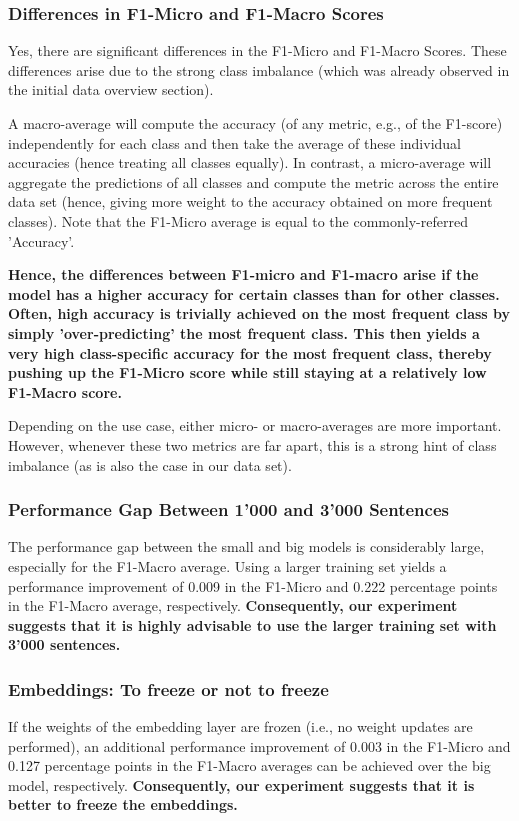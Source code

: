 \documentclass{article}
\begin{document}
\subsubsection{Differences in F1-Micro and F1-Macro Scores}
Yes, there are significant differences in the F1-Micro and F1-Macro Scores. These differences arise due to the strong class imbalance (which was already observed in the initial data overview section).

A macro-average will compute the accuracy (of any metric, e.g., of the F1-score) independently for each class and then take the average of these individual accuracies (hence treating all classes equally). In contrast, a micro-average will aggregate the predictions of all classes and compute the metric across the entire data set (hence, giving more weight to the accuracy obtained on more frequent classes). Note that the F1-Micro average is equal to the commonly-referred 'Accuracy'.

\textbf{Hence, the differences between F1-micro and F1-macro arise if the model has a higher accuracy for certain classes than for other classes. Often, high accuracy is trivially achieved on the most frequent class by simply 'over-predicting' the most frequent class. This then yields a very high class-specific accuracy for the most frequent class, thereby pushing up the F1-Micro score while still staying at a relatively low F1-Macro score.}

Depending on the use case, either micro- or macro-averages are more important. However, whenever these two metrics are far apart, this is a strong hint of class imbalance (as is also the case in our data set). 

\subsubsection{Performance Gap Between 1'000 and 3'000 Sentences}
The performance gap between the small and big models is considerably large, especially for the F1-Macro average. Using a larger training set yields a performance improvement of 0.009 in the F1-Micro and 0.222 percentage points in the F1-Macro average, respectively.  \textbf{Consequently, our experiment suggests that it is highly advisable to use the larger training set with 3'000 sentences.}

\subsubsection{Embeddings: To freeze or not to freeze}
If the weights of the embedding layer are frozen (i.e., no weight updates are performed), an additional performance improvement of 0.003 in the F1-Micro and 0.127 percentage points in the F1-Macro averages can be achieved over the big model, respectively. \textbf{Consequently, our experiment suggests that it is better to freeze the embeddings.}
\end{document}
